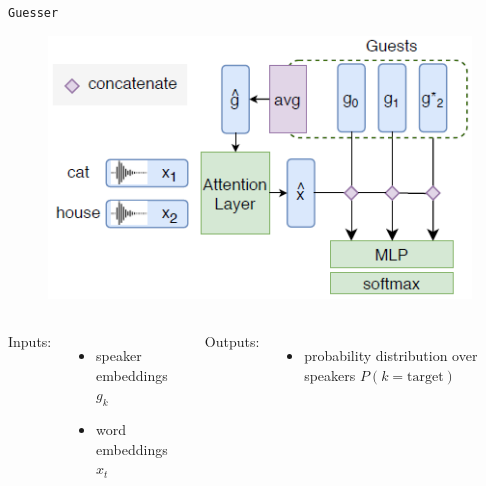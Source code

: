 \documentclass[11pt, aspectratio=169]{beamer}
\newcommand{\guesser}{\texttt{Guesser}}
\newcommand{\rimgscale}{0.7}
\begin{document}
\begin{frame}{\guesser{}}
    \begin{figure}[bht]
    \includegraphics[scale=\rimgscale]{guesser.png}%
    \end{figure}

    \begin{columns}[t]
        Inputs:
        \begin{itemize}
            \item speaker embeddings $g_k$
            \item word embeddings $x_t$
        \end{itemize}

        Outputs:
        \begin{itemize}
            \item probability distribution over speakers $P(k = \text{target})$
        \end{itemize}
    \end{columns}
\end{frame}
\end{document}
